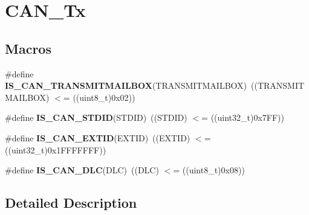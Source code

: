 \hypertarget{group___c_a_n___tx}{\section{C\-A\-N\-\_\-\-Tx}
\label{group___c_a_n___tx}
}
\subsection*{Macros}
\begin{DoxyCompactItemize}
\item 
\hypertarget{group___c_a_n___tx_ga218b3e1380c4d49163c91a1af904e44c}{\#define {\bfseries I\-S\-\_\-\-C\-A\-N\-\_\-\-T\-R\-A\-N\-S\-M\-I\-T\-M\-A\-I\-L\-B\-O\-X}(T\-R\-A\-N\-S\-M\-I\-T\-M\-A\-I\-L\-B\-O\-X)~((T\-R\-A\-N\-S\-M\-I\-T\-M\-A\-I\-L\-B\-O\-X) $<$= ((uint8\-\_\-t)0x02))}\label{group___c_a_n___tx_ga218b3e1380c4d49163c91a1af904e44c}

\item 
\hypertarget{group___c_a_n___tx_gaf059e4383fa69dec6e18216b22a87f51}{\#define {\bfseries I\-S\-\_\-\-C\-A\-N\-\_\-\-S\-T\-D\-I\-D}(S\-T\-D\-I\-D)~((S\-T\-D\-I\-D) $<$= ((uint32\-\_\-t)0x7\-F\-F))}\label{group___c_a_n___tx_gaf059e4383fa69dec6e18216b22a87f51}

\item 
\hypertarget{group___c_a_n___tx_ga62dbc2163ad6751b3f921e717b00e9f2}{\#define {\bfseries I\-S\-\_\-\-C\-A\-N\-\_\-\-E\-X\-T\-I\-D}(E\-X\-T\-I\-D)~((E\-X\-T\-I\-D) $<$= ((uint32\-\_\-t)0x1\-F\-F\-F\-F\-F\-F\-F))}\label{group___c_a_n___tx_ga62dbc2163ad6751b3f921e717b00e9f2}

\item 
\hypertarget{group___c_a_n___tx_ga6109469a6a2792b3e7c6be520ea50d36}{\#define {\bfseries I\-S\-\_\-\-C\-A\-N\-\_\-\-D\-L\-C}(D\-L\-C)~((D\-L\-C) $<$= ((uint8\-\_\-t)0x08))}\label{group___c_a_n___tx_ga6109469a6a2792b3e7c6be520ea50d36}

\end{DoxyCompactItemize}


\subsection{Detailed Description}
